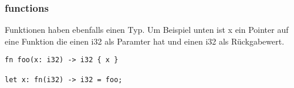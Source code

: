 \subsubsection{functions}

Funktionen haben ebenfalls einen Typ. Um Beispiel unten ist x ein Pointer auf eine Funktion die einen i32 als Paramter hat und einen i32 als Rückgabewert.

\begin{lstlisting}
fn foo(x: i32) -> i32 { x }

let x: fn(i32) -> i32 = foo;
\end{lstlisting}